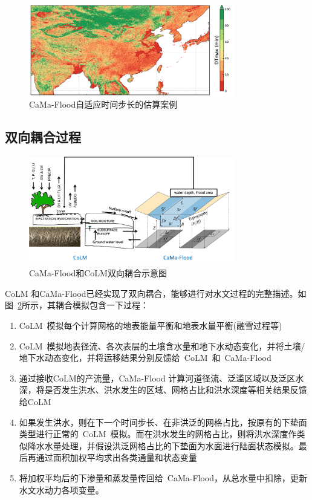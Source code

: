{
\begin{figure}[htbp]
\centering
\includegraphics[width=0.8\textwidth]{Figures/陆地表面的水分循环/自适应时间步长的估算.png}
\caption{CaMa-Flood自适应时间步长的估算案例}
\label{fig:自适应时间步长的估算}
\end{figure}
}
\subsection{双向耦合过程}
{
\begin{figure}[htbp]
\centering
\includegraphics[width=0.8\textwidth]{Figures/陆地表面的水分循环/双向耦合.png}
\caption{CaMa-Flood和CoLM双向耦合示意图}
\label{fig:双向耦合}
\end{figure}
}

CoLM 和CaMa-Flood已经实现了双向耦合，能够进行对水文过程的完整描述。如图~\ref{fig:双向耦合}所示，其耦合模拟包含一下过程：
\begin{enumerate}
\item CoLM~模拟每个计算网格的地表能量平衡和地表水量平衡(融雪过程等)
\item CoLM~模拟地表径流、各次表层的土壤含水量和地下水动态变化，并将土壤/地下水动态变化，并将运移结果分别反馈给~CoLM~和~CaMa-Flood~
\item 通过接收CoLM的产流量，CaMa-Flood 计算河道径流、泛滥区域以及泛区水深，将是否发生洪水、洪水发生的区域、网格占比和洪水深度等相关结果反馈给CoLM
\item 如果发生洪水，则在下一个时间步长、在非洪泛的网格占比，按原有的下垫面类型进行正常的~CoLM~模拟。而在洪水发生的网格占比，则将洪水深度作类似降水水量处理，并假设洪泛网格占比的下垫面为水面进行陆面状态模拟。最后再通过面积加权平均求出各类通量和状态变量
\item 将加权平均后的下渗量和蒸发量传回给~CaMa-Flood，从总水量中扣除，更新水文水动力各项变量。

\end{enumerate}